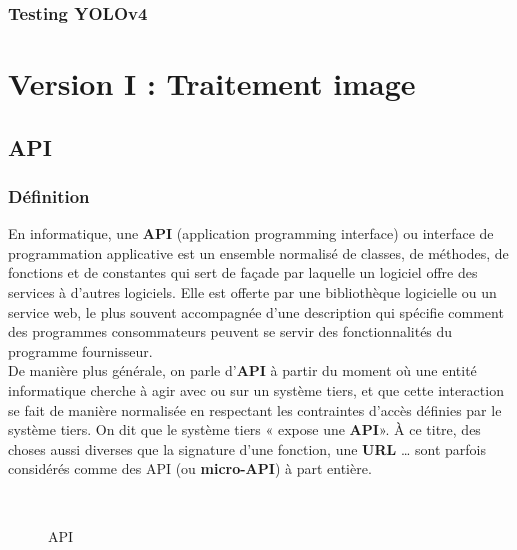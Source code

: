 {\subsection{Testing YOLOv4}



\pagebreak
{}

\chapter{Version I : Traitement image}\thispagestyle{fancy}

\section{API}

    \subsection{Définition}
En informatique, une \textbf{API} (application programming interface) ou interface de programmation applicative est un ensemble normalisé de classes, de méthodes, de fonctions et de constantes qui sert de façade par laquelle un logiciel offre des services à d'autres logiciels. Elle est offerte par une bibliothèque logicielle ou un service web, le plus souvent accompagnée d'une description qui spécifie comment des programmes consommateurs peuvent se servir des fonctionnalités du programme fournisseur.\\[0.5cm]

De manière plus générale, on parle d'\textbf{API} à partir du moment où une entité informatique cherche à agir avec ou sur un système tiers, et que cette interaction se fait de manière normalisée en respectant les contraintes d'accès définies par le système tiers. On dit que le système tiers « expose une \textbf{API}». À ce titre, des choses aussi diverses que la signature d'une fonction, une \textbf{URL} … sont parfois considérés comme des API (ou \textbf{micro-API}) à part entière.\\[0.5cm]

\begin{figure}[h] 
\centering
{}\\[0.5cm]
\caption{API}
\label{fig:figure2}
\end{figure}

}
